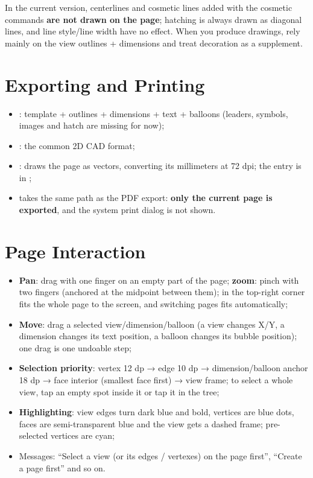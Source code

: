 \begin{warn}
In the current version, centerlines and cosmetic lines added with the cosmetic commands \textbf{are
not drawn on the page}; hatching is always drawn as diagonal lines, and line style/line width have
no effect. When you produce drawings, rely mainly on the view outlines + dimensions and treat
decoration as a supplement.
\end{warn}

\section{Exporting and Printing}

\begin{itemize}
  \item {}: template + outlines + dimensions + text + balloons (leaders, symbols,
        images and hatch are missing for now);
  \item {}: the common 2D CAD format;
  \item {}: draws the page as vectors, converting its millimeters at 72 dpi; the
        entry is  in ;
  \item {} takes the same path as the PDF export: \textbf{only the current page is
        exported}, and the system print dialog is not shown.
\end{itemize}

\section{Page Interaction}

\begin{itemize}
  \item \textbf{Pan}: drag with one finger on an empty part of the page; \textbf{zoom}: pinch with two
        fingers (anchored at the midpoint between them);  in the top-right corner fits the
        whole page to the screen, and switching pages fits automatically;
  \item \textbf{Move}: drag a selected view/dimension/balloon (a view changes X/Y, a dimension
        changes its text position, a balloon changes its bubble position); one drag is one undoable
        step;
  \item \textbf{Selection priority}: vertex 12 dp → edge 10 dp → dimension/balloon anchor 18 dp →
        face interior (smallest face first) → view frame; to select a whole view, tap an empty spot
        inside it or tap it in the tree;
  \item \textbf{Highlighting}: view edges turn dark blue and bold, vertices are blue dots, faces are
        semi-transparent blue and the view gets a dashed frame; pre-selected vertices are cyan;
  \item Messages: ``Select a view (or its edges / vertexes) on the page first'', ``Create a page
        first'' and so on.
\end{itemize}

